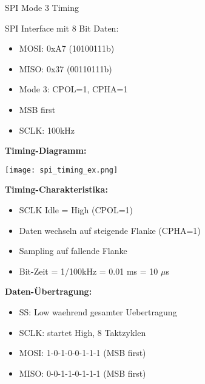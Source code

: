 \begin{example2}{SPI Mode 3 Timing}\\
    \begin{minipage}{0.5\linewidth}
    SPI Interface mit 8 Bit Daten:
    \begin{itemize}
        \item MOSI: 0xA7 (10100111b)
        \item MISO: 0x37 (00110111b)
    \end{itemize}
    \end{minipage}
    \begin{minipage}{0.5\linewidth}
    \begin{itemize}
        \item Mode 3: CPOL=1, CPHA=1
        \item MSB first
        \item SCLK: 100kHz
    \end{itemize}
    \end{minipage}
    
    \textbf{Timing-Diagramm:}
    \begin{center}
    \texttt{[image: spi\_timing\_ex.png]}
    \end{center}

    \begin{minipage}{0.5\linewidth}
        \textbf{Timing-Charakteristika:}
    \begin{itemize}
        \item SCLK Idle = High (CPOL=1)
        \item Daten wechseln auf steigende Flanke (CPHA=1)
        \item Sampling auf fallende Flanke
        \item Bit-Zeit = 1/100kHz = 0.01 ms = 10 $\mu$s
    \end{itemize}
    \end{minipage}
    \begin{minipage}{0.5\linewidth}
        \textbf{Daten-Übertragung:}
    \begin{itemize}
        \item SS: Low waehrend gesamter Uebertragung
        \item SCLK: startet High, 8 Taktzyklen
        \item MOSI: 1-0-1-0-0-1-1-1 (MSB first)
        \item MISO: 0-0-1-1-0-1-1-1 (MSB first)
    \end{itemize}
    \end{minipage}
\end{example2}

